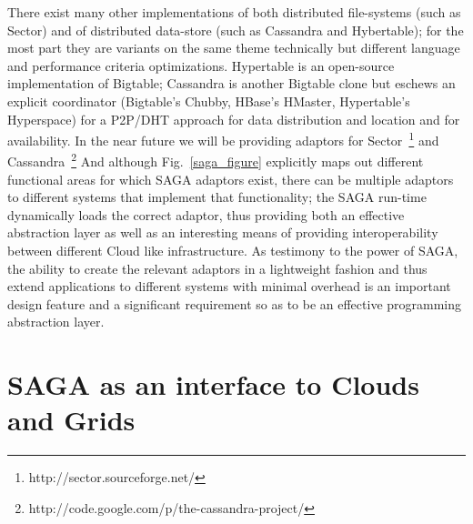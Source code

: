 \documentclass[conference,final]{IEEEtran}
\newcommand{\jhanote}[1]{ {\textcolor{red} { ***SJ: #1 }}}
\newcommand{\jhanote}[1]{}
\begin{document}
There exist many other implementations of both distributed
file-systems (such as Sector) and of distributed data-store (such as
Cassandra and Hybertable); for the most part they are variants on the
same theme technically but different language and performance criteria
optimizations.  Hypertable is an open-source implementation of
Bigtable; Cassandra is another Bigtable clone but eschews an explicit
coordinator (Bigtable's Chubby, HBase's HMaster, Hypertable's
Hyperspace) for a P2P/DHT approach for data distribution and location
and for availability.  In the near future we will be providing
adaptors for Sector~\footnote{http://sector.sourceforge.net/} and
Cassandra~\footnote{http://code.google.com/p/the-cassandra-project/}
And although Fig.~\ref{saga_figure} explicitly maps out different
functional areas for which SAGA adaptors exist, there can be multiple
adaptors to different systems that implement that functionality; the
SAGA run-time dynamically loads the correct adaptor, thus providing
both an effective abstraction layer as well as an interesting means of
providing interoperability between different Cloud like
infrastructure.  As testimony to the power of SAGA, the ability to
create the relevant adaptors in a lightweight fashion and thus extend
applications to different systems with minimal overhead is an
important design feature and a significant requirement so as to be an
effective programming abstraction layer.


\section{SAGA as an interface to Clouds and Grids}




\end{document}
